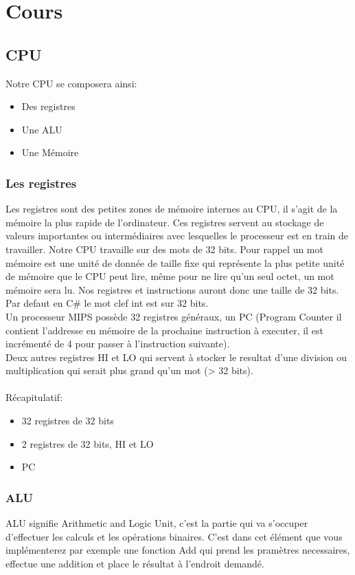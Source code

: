 \section{Cours}

\subsection{CPU}

Notre CPU se composera ainsi:
\begin{itemize}
\item Des registres
\item Une ALU
\item Une Mémoire
\end{itemize}

\subsubsection{Les registres}
Les registres sont des petites zones de mémoire internes au CPU, il s'agit de la
mémoire la plus rapide de l'ordinateur. Ces registres servent au stockage de
valeurs importantes ou intermédiaires avec lesquelles le processeur est en train
de travailler. Notre CPU travaille sur des mots de 32 bits. Pour rappel un mot
mémoire est une unité de donnée de taille fixe qui représente la plus petite
unité de mémoire que le CPU peut lire, même pour ne lire qu'un seul octet, un
mot mémoire sera lu. Nos registres et instructions auront donc une taille de 32
bits. Par defaut en C\# le mot clef int est sur 32 bits.\\ Un processeur MIPS
possède 32 registres généraux, un PC (Program Counter il contient l'addresse en
mémoire de la prochaine instruction à executer,  il est incrémenté de 4 pour
passer à l'instruction suivante).\\ Deux autres registres HI et LO qui servent à
stocker le resultat d'une division ou multiplication qui serait plus grand qu'un
mot (> 32 bits).
\\\\ Récapitulatif:
\begin{itemize}
  \item 32 registres de 32 bits
  \item 2 registres de 32 bits, HI et LO
  \item PC
\end{itemize}

\subsubsection{ALU}
ALU signifie Arithmetic and Logic Unit, c'est la partie qui va s'occuper
d'effectuer les calculs et les  opérations binaires. C'est dans cet élément que
vous implémenterez par exemple une fonction Add qui prend les pramètres
necessaires, effectue une addition et place le résultat à l'endroit demandé.

